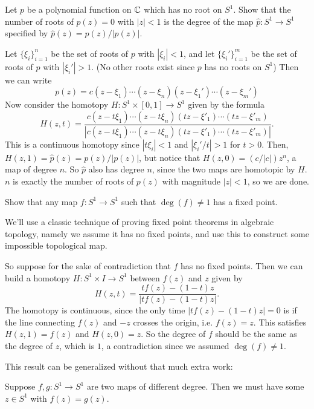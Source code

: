 \begin{problem}{1.1}
    Let $p$ be a polynomial function on $\mathbb{C}$ which has no root on $S^1$. Show that the number of roots of $p(z)=0$ with $|z|<1$ is the degree of the map $\hat{p} : S^1 \to S^1$ specified by $\hat{p}(z)=p(z) / |p(z)|$.
\end{problem}

\begin{solution}
    Let $\{\xi_i\}^n_{i=1}$ be the set of roots of $p$ with $|\xi_i|<1$, and let $\{\xi_i'\}^m_{i=1}$ be the set of roots of $p$ with $|\xi_i'|>1$. (No other roots exist since $p$ has no roots on $S^1$) Then we can write
    \[p(z) = c (z-\xi_1)\cdots (z-\xi_n)(z-\xi_1')\cdots (z-\xi_m')\]
    Now consider the homotopy $H : S^1\times [0,1] \to S^1$ given by the formula
    \[H(z, t) = \frac{c(z-t\xi_1)\cdots (z-t\xi_n)(tz-\xi'_1)\cdots (tz-\xi'_m)}
{|c(z-t\xi_1)\cdots (z-t\xi_n)(tz-\xi'_1)\cdots (tz-\xi'_m)|}. 
    \]
    This is a continuous homotopy since $|t\xi_i|<1$ and $|\xi_i'/t|>1$ for $t>0$. Then, $H(z,1)=\hat{p}(z)=p(z)/|p(z)|$, but notice that $H(z,0)=(c/|c|)z^n$, a map of degree $n$. So $\hat{p}$ also has degree $n$, since the two maps are homotopic by $H$. $n$ is exactly the number of roots of $p(z)$ with magnitude $|z|<1$, so we are done.
\end{solution}

\begin{problem}{1.2}
    Show that any map $f : S^1 \to S^1$ such that $\deg(f)\neq 1$ has a fixed point.
\end{problem}

\begin{solution}
    We'll use a classic technique of proving fixed point theorems in algebraic topology, namely we assume it has no fixed points, and use this to construct some impossible topological map. 

    So suppose for the sake of contradiction that $f$ has no fixed points. Then we can build a homotopy $H: S^1\times I \to S^1$ between $f(z)$ and $z$ given by
    \[H(z,t) = \frac{tf(z)-(1-t)z}{|tf(z)-(1-t)z|}.\]
    The homotopy is continuous, since the only time $|tf(z)-(1-t)z|=0$ is if the line connecting $f(z)$ and $-z$ crosses the origin, i.e. $f(z)=z$. This satisfies $H(z,1) = f(z)$ and $H(z,0)=z$. So the degree of $f$ should be the same as the degree of $z$, which is $1$, a contradiction since we assumed $\deg(f)\neq 1$.

    This result can be generalized without that much extra work:
    \begin{claim}
        Suppose $f,g : S^1 \to S^1$ are two maps of different degree. Then we must have some $z\in S^1$ with $f(z)=g(z)$.
    \end{claim}
\end{solution}


